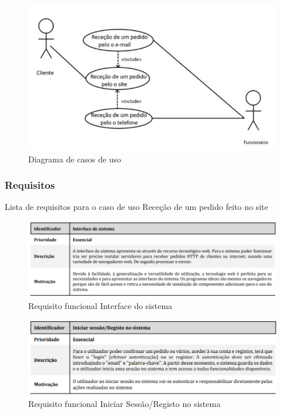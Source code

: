 \begin{figure}[H]
	\centering
	\includegraphics{diagrama_casos_de_uso}
	\caption{Diagrama de casos de uso}
	\label{fig:diagramacasosdeuso}
\end{figure}

\subsubsection{Requisitos}
Lista de requisitos para o caso de uso Receção de um pedido feito no site\\
\begin{figure}[H]
	\centering
	\includegraphics[width=15cm]{requisito_funcional1}
	\caption{Requisito funcional Interface do sistema}
	\label{fig:requisitofuncional1}
\end{figure}

\begin{figure}[H]
	\centering
	\includegraphics[width=15cm]{requisito_funcional2}
	\caption{Requisito funcional Iniciar Sessão/Registo no sistema}
	\label{fig:requisitofuncional2}
\end{figure}

